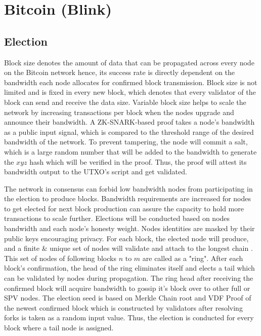 \documentclass[../Bitcoin Blink.tex]{subfiles}
\begin{document}
\section{Bitcoin (Blink)} 
\subsection{Election}
Block size denotes the amount of data that can be propagated across every node on the Bitcoin network hence, its success rate is directly dependent on the bandwidth each node allocates for confirmed block transmission. Block size is not limited and is fixed in every new block, which denotes that every validator of the block can send and receive the data size. Variable block size helps to scale the network by increasing transactions per block when the nodes upgrade and announce their bandwidth. A ZK-SNARK-based proof takes a node’s bandwidth as a public input signal, which is compared to the threshold range of the desired bandwidth of the network. To prevent tampering, the node will commit a salt, which is a large random number that will be added to the bandwidth to generate the $xyz$ hash which will be verified in the proof. Thus, the proof will attest its bandwidth output to the UTXO’s script and get validated. 

The network in consensus can forbid low bandwidth nodes from participating in the election to produce blocks. Bandwidth requirements are increased for nodes to get elected for next block production can assure the capacity to hold more transactions to scale further. Elections will be conducted based on nodes bandwidth and each node's honesty weight. Nodes identities are masked by their public keys encouraging privacy. For each block, the elected node will produce, and a finite \& unique set of nodes will validate and attach to the longest chain \cite{nakamoto2008bitcoin} . This set of nodes of following blocks $n \text{ to } m$ are called as a "ring". After each block's confirmation, the head of the ring eliminates itself and elects a tail which can be validated by nodes during propagation. The ring head after receiving the confirmed block will acquire bandwidth to gossip it's block over to other full or SPV nodes. The election seed is based on Merkle Chain root and VDF Proof \cite{yakovenko2018solana} of the newest confirmed block which is constructed by validators after resolving forks is taken as a random input value. Thus, the election is conducted for every block where a tail node is assigned.
\end{document}

